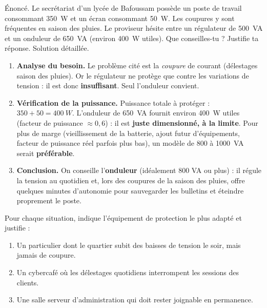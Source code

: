 \documentclass[11pt]{article}
\begin{document}
\begin{exoresolu}
Énoncé. Le secrétariat d'un lycée de Bafoussam possède un poste de travail consommant \SI{350}{W} et un écran consommant \SI{50}{W}. Les coupures y sont fréquentes en saison des pluies. Le proviseur hésite entre un régulateur de \SI{500}{VA} et un onduleur de \SI{650}{VA} (environ \SI{400}{W} utiles). Que conseilles-tu ? Justifie ta réponse.
\tcblower
Solution détaillée.
\begin{enumerate}
\item \textbf{Analyse du besoin.} Le problème cité est la \emph{coupure} de courant (délestages saison des pluies). Or le régulateur ne protège que contre les variations de tension : il est donc \textbf{insuffisant}. Seul l'onduleur convient.
\item \textbf{Vérification de la puissance.} Puissance totale à protéger : $350 + 50 = \SI{400}{W}$. L'onduleur de \SI{650}{VA} fournit environ \SI{400}{W} utiles (facteur de puissance $\approx 0,6$) : il est \textbf{juste dimensionné, à la limite}. Pour plus de marge (vieillissement de la batterie, ajout futur d'équipements, facteur de puissance réel parfois plus bas), un modèle de 800 à \SI{1000}{VA} serait \textbf{préférable}.
\item \textbf{Conclusion.} On conseille l'\textbf{onduleur} (idéalement 800 VA ou plus) : il régule la tension au quotidien et, lors des coupures de la saison des pluies, offre quelques minutes d'autonomie pour sauvegarder les bulletins et éteindre proprement le poste.
\end{enumerate}
\end{exoresolu}

\begin{exercice}
Pour chaque situation, indique l'équipement de protection le plus adapté et justifie :
\begin{enumerate}
\item Un particulier dont le quartier subit des baisses de tension le soir, mais jamais de coupure.
\item Un cybercafé où les délestages quotidiens interrompent les sessions des clients.
\item Une salle serveur d'administration qui doit rester joignable en permanence.
\end{enumerate}
\end{exercice}
\end{document}
